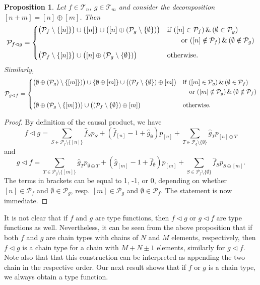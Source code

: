 \documentclass[12pt]{article}
\newtheorem{prop}{Proposition}
\theoremstyle{definition}
\theoremstyle{remark}
\def\Te{\mathcal T}
\def\Pe{\mathcal P}
\def\vtl{\vartriangleleft}
\begin{document}
\begin{prop}\label{prop:vtl_ordinal} Let $f\in \Te_{n}$, $g\in \Te_{m}$ and
consider the decomposition $[n+m]=[n]\oplus[m]$. Then  
\[
\Pe_{f\vtl g}=\begin{dcases}\bigl(\Pe_{f}\setminus \{[n]\}\bigr) \cup  \{[n]\} \cup \bigl([n]\oplus
(\Pe_{g}\setminus \{\emptyset\})\bigr)& \text{if } ([n]\in \Pe_{f})\, \&\, (\emptyset\in
\Pe_{g})\\  \ & \qquad \text{or } ([n]\notin \Pe_{f})\, \&\, (\emptyset\notin
\Pe_{g})\\[5pt]
\bigl(\Pe_{f}\setminus \{[n]\}\bigr) \cup \bigl([n]\oplus
(\Pe_{g}\setminus \{\emptyset\})\bigr) & \text{otherwise}.
\end{dcases}
\]
Similarly,
\[
\Pe_{g\vtl f}=\begin{dcases}\bigl(\emptyset \oplus (\Pe_{g})\setminus
\{[m]\})\bigr) \cup  \{\emptyset\oplus [m]\} \cup \bigl((\Pe_{f}\setminus
\{\emptyset\})\oplus [m]\bigr)& \text{if } ([m]\in \Pe_{g})\, \&\, (\emptyset\in
\Pe_{f})\\  \ & \quad \text{or } ([m]\notin \Pe_{g})\, \&\, (\emptyset\notin
\Pe_{f})\\[5pt]
\bigl(\emptyset\oplus (\Pe_{g}\setminus \{[m]\})\bigr) \cup \bigl((\Pe_{f}\setminus
\{\emptyset\})\oplus[m]\bigr) & \text{otherwise}.
\end{dcases}
\]

\end{prop}


\begin{proof} By definition of the causal product, we have  
\[
f\vtl g=\sum_{S\in \Pe_f\setminus\{[n]\}} \hat f_Sp_S+ (\hat f_{[n]}-1 + \hat
g_\emptyset)p_{[n]}+\sum_{T\in \Pe_g\setminus \{\emptyset\}} \hat g_T p_{[n]\oplus T}
\]
and 
\[
g\vtl f=\sum_{T\in \Pe_g\setminus\{[m]\}} \hat g_Tp_{\emptyset\oplus T}+ (\hat g_{[m]}-1 + \hat
f_\emptyset)p_{[m]}+\sum_{S\in \Pe_f\setminus \{\emptyset\}} \hat f_S p_{S\oplus [m]}.
\]
The terms in brackets can be equal to 1, -1, or 0, depending on whether $[n]\in \Pe_f$ and
$\emptyset\in \Pe_g$, resp. $[m]\in \Pe_g$ and $\emptyset 
\in \Pe_f$. The statement is now immediate.


\end{proof}



It is not clear that if $f$ and $g$ are type functions, then $f\vtl g$ or $g\vtl
f$ are type functions as well. Nevertheless, it can be seen from the above proposition
that if both $f$ and $g$ are chain types with chains of $N$ and $M$ elements,
respectively, then $f\vtl g$ is a chain type for a chain with $M+N\pm 1$
elements, similarly for $g\vtl f$. Note also that that this construction can be
interpreted as appending the two chain in the respective order. 
Our next result shows that if $f$ or $g$ is a chain type, we always obtain a type
function.
\end{document}
